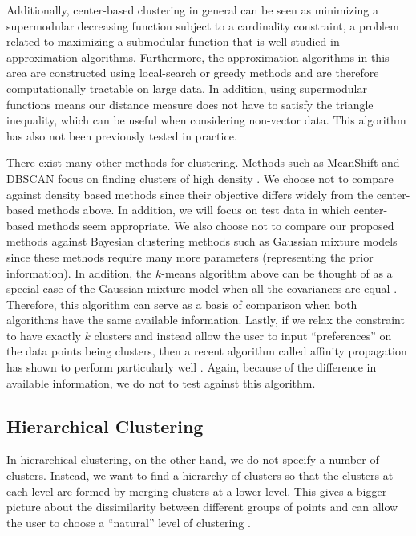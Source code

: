 \documentclass{article}
\begin{document}
Additionally, center-based clustering in general can be seen as minimizing a supermodular decreasing function subject to a cardinality constraint, a problem related to maximizing a submodular function that is well-studied in approximation algorithms. Furthermore, the approximation algorithms in this area are constructed using local-search or greedy methods and are therefore computationally tractable on large data. In addition, using supermodular functions means our distance measure does not have to satisfy the triangle inequality, which can be useful when considering non-vector data. This algorithm has also not been previously tested in practice. 

There exist many other methods for clustering. Methods such as MeanShift and DBSCAN focus on finding clusters of high density \cite{Comaniciu, Ester}. We choose not to compare against density based methods since their objective differs widely from the center-based methods above. In addition, we will focus on test data in which center-based methods seem appropriate. We also choose not to compare our proposed methods against Bayesian clustering methods such as Gaussian mixture models since these methods require many more parameters (representing the prior information). In addition, the $k$-means algorithm above can be thought of as a special case of the Gaussian mixture model when all the covariances are equal \cite{ESL}. Therefore, this algorithm can serve as a basis of comparison when both algorithms have the same available information. Lastly, if we relax the constraint to have exactly $k$ clusters and instead allow the user to input ``preferences'' on the data points being clusters, then a recent algorithm called affinity propagation has shown to perform particularly well \cite{Frey}. Again, because of the difference in available information, we do not to test against this algorithm.  

\subsection{Hierarchical Clustering}

In hierarchical clustering, on the other hand, we do not specify a number of clusters. Instead, we want to find a hierarchy of clusters so that the clusters at each level are formed by merging clusters at a lower level. This gives a bigger picture about the dissimilarity between different groups of points and can allow the user to choose a ``natural'' level of clustering \cite{ESL}. 
\end{document}
